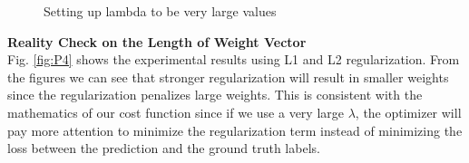 \documentclass{article} %
\begin{document}
\begin{figure}%
	\centering
	\qquad
	\caption{Setting up lambda to be very large values}%
	\label{fig:P11}%
\end{figure}

\textbf{Reality Check on the Length of Weight Vector}\\
Fig. \ref{fig:P4} shows the experimental results using L1 and L2 regularization. From the figures we can see that stronger regularization will result in smaller weights since the regularization penalizes large weights. This is consistent with the mathematics of our cost function since if we use a very large $\lambda$, the optimizer will pay more attention to minimize the regularization term instead of minimizing the loss between the prediction and the ground truth labels. 
\end{document}
